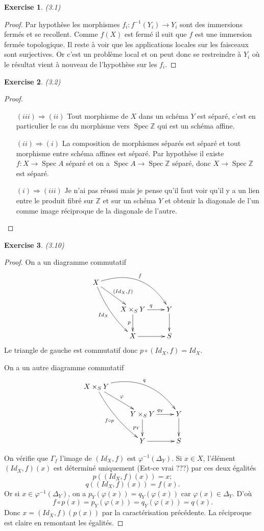 \documentclass[A4, 11pt]{article}
\newtheorem{exer}{Exercise}
\def\Z{{\mathbb Z}}
\def\Spec{ \operatorname{Spec}}
\begin{document}
 \begin{exer}(3.1)
 \end{exer}
 \begin{proof}
 Par hypothèse les morphismes $f_i\colon f^{-1}(Y_i)\rightarrow Y_i$ sont des immersions fermés et se recollent. Comme $f(X)$ est fermé il suit que $f$ est une immersion fermée topologique. Il reste à voir que les applications locales sur les faisceaux sont surjectives. Or c'est un problème local et on peut donc se restreindre à $Y_i$ où le résultat vient à nouveau de l'hypothèse sur les $f_i$. 
 \end{proof}
 \begin{exer}(3.2)
 \end{exer}
 \begin{proof}
 \begin{itemize}
 \item[$(iii)\Rightarrow (ii)$] Tout morphisme de $X$ dans un schéma $Y$ est séparé, c'est en particulier le cas du morphisme vers $\Spec \Z$ qui est un schéma affine.
  \item[$(ii)\Rightarrow (i)$] La composition de morphismes séparés est séparé et tout morphisme entre schéma affines est séparé. Par hypothèse il existe $f\colon X\rightarrow \Spec A$ séparé et on a $\Spec A \rightarrow \Spec \Z$ séparé, donc $X\rightarrow \Spec \Z$ est séparé.
   \item[$(i)\Rightarrow (iii)$] Je n'ai pas réussi mais je pense qu'il faut voir qu'il y a un lien entre le produit fibré sur $\Z$ et sur un schéma $Y$ et obtenir la diagonale de l'un comme image réciproque de la diagonale de l'autre. 
 \end{itemize}
 \end{proof}
 \begin{exer}(3.10)
 \end{exer}
 \begin{proof}
 On a un diagramme commutatif
$$\xymatrix{
X \ar@/_/[ddr]_{Id_X} \ar[rd]^{(Id_X,f)} \ar@/^2pc/[rrd]^{f}  & & \\
& X\times_S Y \ar[r]^{q} \ar[d]_{p} & Y\ar[d] \\
& X\ar[r] & S \\
}$$
Le triangle de gauche est commutatif donc $p\circ (Id_X,f)=Id_X$.


On a un autre diagramme commutatif
$$\xymatrix{
X\times_S Y \ar@/_/[ddr]_{f\circ p} \ar[rd]^{\varphi} \ar@/^2pc/[rrd]^{q}  & & \\
& Y\times_S Y \ar[r]^{q_Y} \ar[d]_{p_Y} & Y\ar[d] \\
& Y\ar[r] & S \\
}$$

On vérifie que $\Gamma_f$ l'image de $(Id_X,f)$ est $\varphi^{-1}(\Delta_Y)$. 
Si $x\in X$, l'élément $(Id_X,f)(x)$ est déterminé uniquement (Est-ce vrai ???) par ces deux égalités 
$$p( (Id_X,f)(x))= x;$$
$$q ( (Id_X,f)(x))=f(x).$$
Or si $x\in \varphi^{-1}(\Delta_Y)$, on a $p_Y(\varphi(x))=q_Y(\varphi(x))$ car $\varphi(x)\in \Delta_Y$. D'où
$$f\circ p (x)=p_Y (\varphi (x))=q_Y(\varphi(x))=q(x).$$
Donc $x=(Id_X,f)(p(x))$ par la caractérisation précédente. La réciproque est claire en remontant les égalités. 
 \end{proof}
\end{document}
